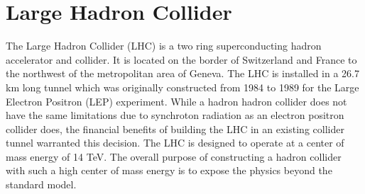 \chapter{Large Hadron Collider}%
The Large Hadron Collider (LHC) is a two ring superconducting hadron 
accelerator and collider. It is located on the border of Switzerland
and France to the northwest of the metropolitan area of Geneva.
The LHC is installed in a 26.7 km long tunnel which was originally constructed
from 1984 to 1989 for the Large Electron Positron (LEP) experiment. 
While a hadron hadron collider does not have the same limitations
due to synchroton radiation as an electron positron collider does, %
the financial benefits of building the LHC in an existing collider tunnel 
warranted this decision. 
%
The LHC is designed to operate at a center of mass energy of 14 TeV.
The overall purpose of constructing a hadron collider with such a high
center of mass energy is to expose the physics beyond the standard model.  

